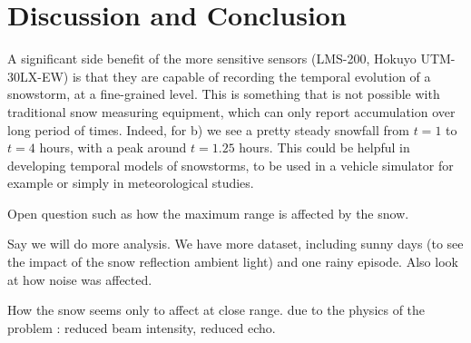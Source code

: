 \section{Discussion and Conclusion}

A significant side benefit of the more sensitive sensors (LMS-200, Hokuyo UTM-30LX-EW) is that they are capable of recording the temporal evolution of a snowstorm, at a fine-grained level. This is something that is not possible with traditional snow measuring equipment, which can only report accumulation over long period of times. Indeed, for b) we see a pretty steady snowfall from $t=1$ to $t=4$ hours, with a peak around $t=1.25$ hours. This could be helpful in developing temporal models of snowstorms, to be used in a vehicle simulator for example or simply in meteorological studies.

Open question such as how the maximum range is affected by the snow.

Say we will do more analysis.
We have more dataset, including sunny days (to see the impact of the snow reflection ambient light) and one rainy episode. Also look at how noise was affected.

How the snow seems only to affect at close range. due to the physics of the problem : reduced beam intensity, reduced echo.
